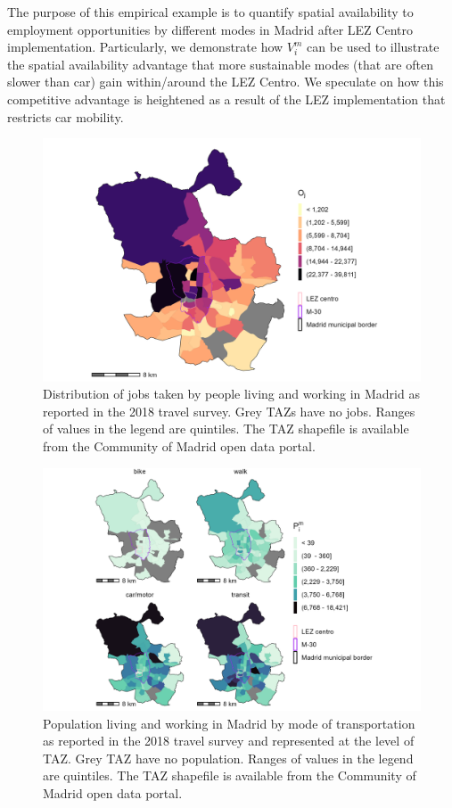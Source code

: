\documentclass[10pt,letterpaper]{article}
\begin{document}
The purpose of this empirical example is to quantify spatial
availability to employment opportunities by different modes in Madrid
after LEZ Centro implementation. Particularly, we demonstrate how
\(V_i^m\) can be used to illustrate the spatial availability advantage
that more sustainable modes (that are often slower than car) gain
within/around the LEZ Centro. We speculate on how this competitive
advantage is heightened as a result of the LEZ implementation that
restricts car mobility.

\begin{figure}

{\centering \includegraphics[width=0.85\linewidth]{images/Fig2} 

}

\caption{\label{fig:Fig2} Distribution of jobs taken by people living and working in Madrid as reported in the 2018 travel survey. Grey TAZs have no jobs. Ranges of values in the legend are quintiles. The TAZ shapefile is available from the Community of Madrid open data portal.}\label{fig:jobs-plot}
\end{figure}

\begin{figure}

{\centering \includegraphics[width=0.85\linewidth]{images/Fig3} 

}

\caption{\label{fig:Fig3} Population living and working in Madrid by mode of transportation as reported in the 2018 travel survey and represented at the level of TAZ. Grey TAZ have no population. Ranges of values in the legend are quintiles. The TAZ shapefile is available from the Community of Madrid open data portal.}\label{fig:pop-plot}
\end{figure}
\end{document}
